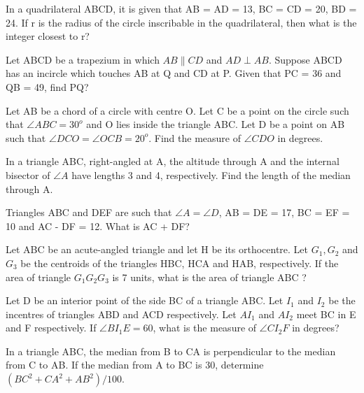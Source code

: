 \item In a quadrilateral ABCD, it is given that AB = AD = 13, BC = CD = 20, BD = 24. If r is the radius of the circle inscribable in the quadrilateral, then what is the integer closest to r?

\item Let ABCD be a trapezium in which $AB \parallel CD$ and $AD \perp AB$. Suppose ABCD has an incircle which touches AB at Q and CD at P. Given that PC = 36 and QB = 49, find PQ?

\item Let AB be a chord of a circle with centre O. Let C be a point on the circle such that $\angle ABC = 30^{o}$ and O lies inside the triangle ABC. Let D be a point on AB such that $\angle DCO = \angle OCB = 20^{o}$. Find the measure of 
$\angle CDO$ in degrees.

\item In a triangle ABC, right-angled at A, the altitude through A and the internal bisector of $\angle A$ have lengths 3 and 4, respectively. Find the length of the median through A.

\item Triangles ABC and DEF are such that $\angle A = \angle D$, AB = DE = 17, BC = EF = 10 and AC - DF = 12. What is 
AC + DF?

\item Let ABC be an acute-angled triangle and let H be its orthocentre. Let $G_1, G_2$ and $G_3 $ be the centroids of the triangles HBC, HCA and HAB, respectively. If the area of triangle $G_1G_2G_3 $ is 7 units, what is the area of triangle ABC ?

\item Let D be an interior point of the side BC of a triangle ABC. Let $I_1$ and $I_2$ be the incentres of triangles ABD and ACD respectively. Let $AI_1$  and $AI_2$ meet BC in E and F respectively. If $\angle BI_1 E = 60$, what is the measure of $\angle CI_2F$ in degrees?

\item In a triangle ABC, the median from B to CA is perpendicular to the median from C to AB. If the median from A to BC is 30, determine $(BC^2 + CA^2 + AB^2)/100$.